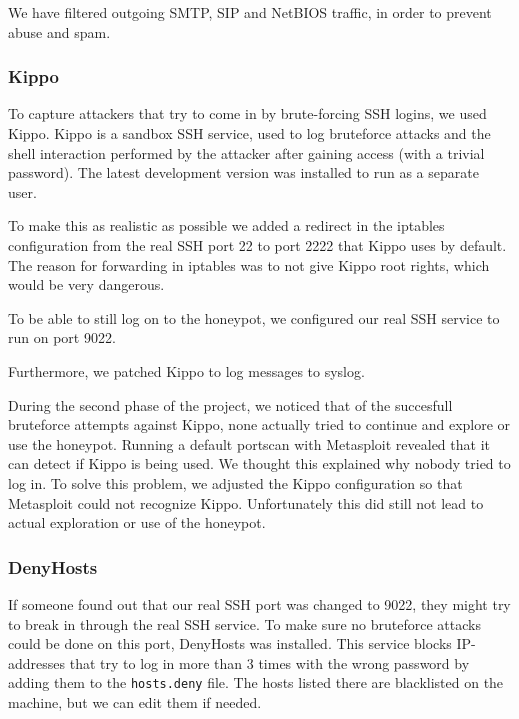 \documentclass[11pt]{article}
\begin{document}
We have filtered outgoing SMTP, SIP and NetBIOS traffic, in order to prevent abuse and spam.

\subsubsection{Kippo}
To capture attackers that try to come in by brute-forcing SSH logins, we used Kippo. 
Kippo is a sandbox SSH service, used to log bruteforce attacks and the shell interaction performed by the attacker after gaining access (with a trivial password). 
The latest development version was installed to run as a separate user.

To make this as realistic as possible we added a redirect in the iptables configuration from the real SSH port 22 to port 2222 that Kippo uses by default.
The reason for forwarding in iptables was to not give Kippo root rights, which would be very dangerous.


To be able to still log on to the honeypot, we configured our real SSH service to run on port 9022.

Furthermore, we patched Kippo to log messages to syslog.

During the second phase of the project, we noticed that of the succesfull bruteforce attempts against Kippo, none actually tried to continue and explore or use the honeypot. Running a default portscan with Metasploit revealed that it can detect if Kippo is being used. We thought this explained why nobody tried to log in. To solve this problem, we adjusted the Kippo configuration so that Metasploit could not recognize Kippo. Unfortunately this did still not lead to actual exploration or use of the honeypot. 

\subsubsection{DenyHosts}
If someone found out that our real SSH port was changed to 9022, they might try to break in through the real SSH service.
To make sure no bruteforce attacks could be done on this port, DenyHosts was installed.
This service blocks IP-addresses that try to log in more than 3 times with the wrong password by adding them to the \verb|hosts.deny| file.
The hosts listed there are blacklisted on the machine, but we can edit them if needed.
\end{document}
